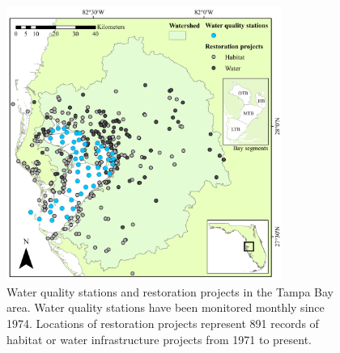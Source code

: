 \documentclass[]{article}
\begin{document}
\begin{figure}
\centerline{\includegraphics[width = 0.8\textwidth]{figs/tbrest_map.pdf}}
\caption{Water quality stations and restoration projects in the Tampa Bay area.  Water quality stations have been monitored monthly since 1974.  Locations of restoration projects represent 891 records of habitat or water infrastructure projects from 1971 to present.}
\label{fig:map}
\end{figure}
\end{document}
